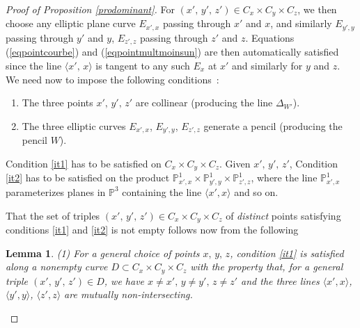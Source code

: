 \documentclass[10pt,a4paper]{amsart}
\newtheorem{lemm}{Lemma}
\begin{document}
\begin{proof}[Proof of Proposition \ref{prodominant}]
 For $(x',\,y',\,z')\in C_x\times C_y\times C_z$, we then choose  any elliptic plane curve $E_{x',x}$  passing through $x'$ and $x$, and similarly $E_{y',y}$  passing through $y'$ and $y$, $E_{z',z}$  passing through $z'$ and $z$.
Equations (\ref{eqpointcourbe}) and (\ref{eqpointmultmoinsun}) are then automatically satisfied since the line $\langle x',\,x\rangle$ is tangent to any such $E_x$ at $x'$ and similarly for $y$ and $z$. We need now  to impose the following  conditions~:
\begin{enumerate}
\item \label{it1} The three points $x',\,y',\,z'$ are collinear (producing the line $\Delta_{W'}$).
\item \label{it2} The three elliptic curves $E_{x',x}$, $E_{y',y}$, $E_{z',z}$ generate a pencil (producing the  pencil $W$).

\end{enumerate}
Condition \ref{it1} has to be satisfied on $C_x\times C_y\times C_z$. Given $x',\,y',\,z'$, Condition \ref{it2} has to be satisfied on
the product $\mathbb{P}^1_{x',x}\times \mathbb{P}^1_{y',y}\times \mathbb{P}^1_{z',z}$, where the line $\mathbb{P}^1_{x',x}$  parameterizes planes in $\mathbb{P}^3$ containing the line $\langle x',x\rangle$  and so on.

That the set of triples $(x',\,y',\,z')\in C_x\times C_y\times C_z$ of {\it distinct } points satisfying conditions \ref{it1} and \ref{it2} is not empty  follows now from the following
\begin{lemm} (1) For a general choice of points $x,\,y,\,z$, condition \ref{it1} is satisfied along a nonempty curve $D\subset C_x\times C_y\times C_z$ with the property that, for a general triple $(x',\,y',\,z')\in D$, we have $x\not=x',\,y\not=y',\,z\not=z'$ and the three lines  $\langle x',x\rangle$, $\langle y',y\rangle$, $\langle z',z\rangle$ are mutually non-intersecting.


\end{lemm}
\end{proof}
\end{document}
